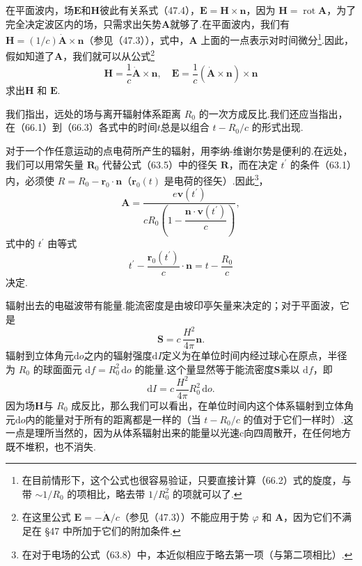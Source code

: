 在平面波内，场$\boldsymbol{E}$和$\boldsymbol{H}$彼此有关系式（47.4），$\boldsymbol{E}=\boldsymbol{H}\times\boldsymbol{n}$，因为 $\boldsymbol{H}=\operatorname{rot}\boldsymbol{A}$，为了完全决定波区内的场，只需求出矢势$\boldsymbol{A}$就够了.在平面波内，我们有 $\boldsymbol{H}=(1/c)\dot{\boldsymbol{A}}\times\boldsymbol{n}$（参见（47.3）），式中，$\boldsymbol{A}$ 上面的一点表示对时间微分\footnote{在目前情形下，这个公式也很容易验证，只要直接计算（66.2）式的旋度，与带 $\sim 1/R_0$ 的项相比，略去带 $1/R_0^2$ 的项就可以了.}.因此，假如知道了$\boldsymbol{A}$，我们就可以从公式\footnote{在这里公式 $\boldsymbol{E}=-\dot{\boldsymbol{A}}/c$（参见（47.3））不能应用于势 $\varphi$ 和 $\boldsymbol{A}$，因为它们不满足在 §47 中所加于它们的附加条件.}
\begin{equation}
  \boldsymbol{H}=\frac{1}{c}\dot{\boldsymbol{A}}\times\boldsymbol{n},\quad
  \boldsymbol{E}=\frac{1}{c}(\dot{\boldsymbol{A}}\times\boldsymbol{n})\times\boldsymbol{n}
\end{equation}
求出$\boldsymbol{H}$ 和 $\boldsymbol{E}$.

我们指出，远处的场与离开辐射体系距离 $R_0$ 的一次方成反比.我们还应当指出，在（66.1）到（66.3）各式中的时间$t$总是以组合 $t-R_0/c$ 的形式出现.

对于一个作任意运动的点电荷所产生的辐射，用李纳-维谢尔势是便利的.在远处，我们可以用常矢量 $\boldsymbol{R}_0$ 代替公式（63.5）中的径矢 $\boldsymbol{R}$，而在决定 $t^{\prime}$ 的条件（63.1）内，必须使 $R=R_0-\boldsymbol{r}_0\cdot\boldsymbol{n}$（$\boldsymbol{r}_0(t)$ 是电荷的径矢）.因此\footnote{在对于电场的公式（63.8）中，本近似相应于略去第一项（与第二项相比）.}，
\begin{equation}
  \boldsymbol{A}=\frac{e\boldsymbol{v}(t^{\prime})}{cR_0\left(1-\dfrac{\boldsymbol{n}\cdot\boldsymbol{v}(t^{\prime})}{c}\right)},
\end{equation}
式中的 $t^{\prime}$ 由等式
\begin{equation}
  t^{\prime}-\frac{\boldsymbol{r}_0(t^{\prime})}{c}\cdot\boldsymbol{n}=t-\frac{R_0}{c}
\end{equation}
决定.

辐射出去的电磁波带有能量.能流密度是由坡印亭矢量来决定的；对于平面波，它是
\begin{equation*}
  \boldsymbol{S}=c\,\frac{H^2}{4\pi}\boldsymbol{n}.
\end{equation*}
辐射到立体角元$\mathrm{d}o$之内的辐射强度$\mathrm{d}I$定义为在单位时间内经过球心在原点，半径为 $R_0$ 的球面面元 $\mathrm{d}f=R_0^2\,\mathrm{d}o$ 的能量.这个量显然等于能流密度$\boldsymbol{S}$乘以 $\mathrm{d}f$，即
\begin{equation}
  \mathrm{d}I=c\,\frac{H^2}{4\pi}R_0^2\,\mathrm{d}o.
\end{equation}
因为场$\boldsymbol{H}$与 $R_0$ 成反比，那么我们可以看出，在单位时间内这个体系辐射到立体角元$\mathrm{d}o$内的能量对于所有的距离都是一样的（当 $t-R_0/c$ 的值对于它们一样时）.这一点是理所当然的，因为从体系辐射出来的能量以光速c向四周散开，在任何地方既不堆积，也不消失.

